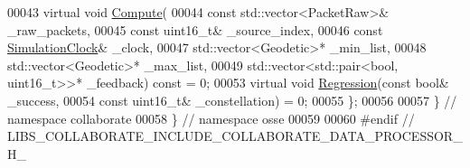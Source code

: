 \begin{DoxyCode}
00043   \textcolor{keyword}{virtual} \textcolor{keywordtype}{void} \hyperlink{classosse_1_1collaborate_1_1_data_processor_af984306eb4619e7d5823a7293fe568cb}{Compute}(
00044       \textcolor{keyword}{const} std::vector<PacketRaw>& \_raw\_packets,
00045       \textcolor{keyword}{const} uint16\_t& \_source\_index,
00046       \textcolor{keyword}{const} \hyperlink{classosse_1_1collaborate_1_1_simulation_clock}{SimulationClock}& \_clock,
00047       std::vector<Geodetic>* \_min\_list,
00048       std::vector<Geodetic>* \_max\_list,
00049       std::vector<std::pair<bool, uint16\_t>>* \_feedback) \textcolor{keyword}{const} = 0;
00053   \textcolor{keyword}{virtual} \textcolor{keywordtype}{void} \hyperlink{classosse_1_1collaborate_1_1_data_processor_a4efa75369a65d2a6011093facfcac44a}{Regression}(\textcolor{keyword}{const} \textcolor{keywordtype}{bool}& \_success,
00054                           \textcolor{keyword}{const} uint16\_t& \_constellation) = 0;
00055 \};
00056 
00057 \}  \textcolor{comment}{// namespace collaborate}
00058 \}  \textcolor{comment}{// namespace osse}
00059 
00060 \textcolor{preprocessor}{#endif  // LIBS\_COLLABORATE\_INCLUDE\_COLLABORATE\_DATA\_PROCESSOR\_H\_}
\end{DoxyCode}
